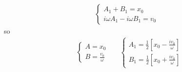 \documentclass[../notes.tex]{subfiles}
\begin{document}
\begin{itemize}
\begin{itemize}
\begin{align*}
\begin{cases}
                A_1+B_1=x_0\\
                i\omega A_1-i\omega B_1=v_0
            \end{cases}
        \end{align*}
        so
        \begin{align*}
            &
            \begin{cases}
                A=x_0\\
                B=\frac{v_0}{\omega}
            \end{cases}
            &&
            \begin{cases}
                A_1=\frac{1}{2}\left[ x_0-\frac{iv_0}{\omega} \right]\\
                B_1=\frac{1}{2}\left[ x_0+\frac{iv_0}{\omega} \right]
            \end{cases}
        \end{align*}
    \end{itemize}
\end{itemize}
\end{document}
